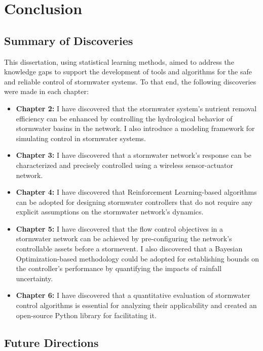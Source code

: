 \chapter{Conclusion}\label{ch:conclusion}
\section{Summary of Discoveries}

This dissertation, using statistical learning methods, aimed to address the knowledge gaps to support the development of tools and algorithms for the safe and reliable control of stormwater systems.
To that end, the following discoveries were made in each chapter:

\begin{itemize}
	\item \textbf{Chapter 2:} I have discovered that the stormwater system's nutrient removal efficiency can be enhanced by controlling the hydrological behavior of stormwater basins in the network. I also introduce a modeling framework for simulating control in stormwater systems.
	\item \textbf{Chapter 3:} I have discovered that a stormwater network's response can be characterized and precisely controlled using a wireless sensor-actuator network.  
	\item \textbf{Chapter 4:} I have discovered that Reinforcement Learning-based algorithms can be adopted for designing stormwater controllers that do not require any explicit assumptions on the stormwater network's dynamics.
	\item \textbf{Chapter 5:} I have discovered that the flow control objectives in a stormwater network can be achieved by pre-configuring the network's controllable assets before a stormevent. I also discovered that a Bayesian Optimization-based methodology could be adopted for establishing bounds on the controller’s performance by quantifying the impacts of rainfall uncertainty. 
	\item \textbf{Chapter 6:} I have discovered that a quantitative evaluation of stormwater control algorithms is essential for analyzing their applicability and created an open-source Python library for facilitating it. 
\end{itemize}

\section{Future Directions}


